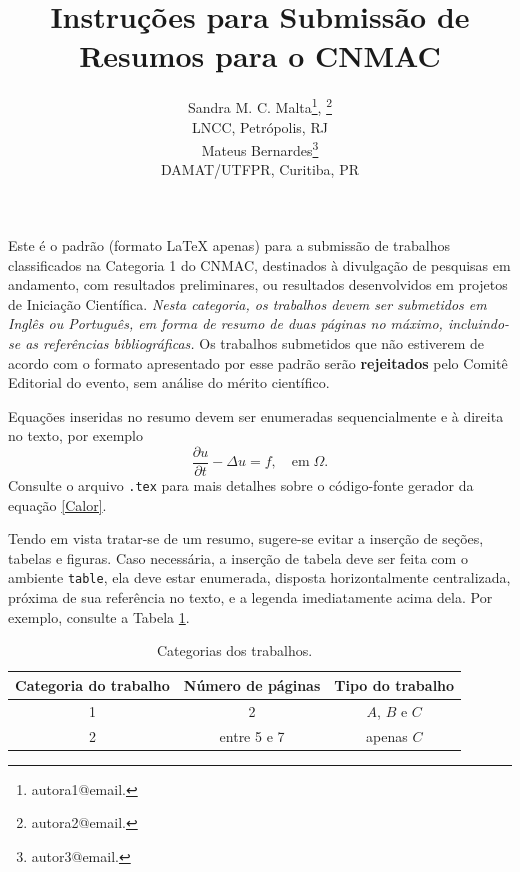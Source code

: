 \documentclass{pssbmac}
\begin{document}

\title{Instruções para Submissão de Resumos para o CNMAC}

\author{
    {\large Sandra M. C. Malta}\thanks{autora1@email.}, {\color{red}{\large Sandra M. C. Malta}\thanks{autora2@email.}}\\
    {\small LNCC, Petrópolis, RJ} \\
    {\large Mateus Bernardes}\thanks{autor3@email.}  \\
    {\small DAMAT/UTFPR, Curitiba, PR} \\
}
\criartitulo



Este é o padrão (formato \LaTeX{} apenas) para a submissão de trabalhos classificados na Categoria 1 do CNMAC, destinados à divulgação de pesquisas em andamento, com resultados preliminares, ou resultados desenvolvidos em projetos de Iniciação Científica. \emph{Nesta categoria, os trabalhos devem ser submetidos em Inglês ou Português, em forma de resumo de duas páginas no máximo, incluindo-se as referências bibliográficas.} Os trabalhos submetidos que não estiverem de acordo com o formato apresentado por esse padrão serão {\bf rejeitados} pelo Comitê Editorial do evento, sem análise do mérito científico.

Equações inseridas no resumo devem ser enumeradas sequencialmente e à direita no texto, por exemplo
\begin{equation}
\frac{\partial u}{\partial t}-\Delta u = f, \quad  \mathrm{em} \; \Omega. \label{Calor}
\end{equation}
Consulte o arquivo \verb!.tex! para mais detalhes sobre o código-fonte gerador da equação \eqref{Calor}.

Tendo em vista tratar-se de um resumo, sugere-se evitar a inserção de seções, tabelas e figuras. Caso necessária, a inserção de tabela deve ser feita com o ambiente \verb!table!, ela deve estar enumerada, disposta horizontalmente centralizada, próxima de sua referência no texto, e a legenda imediatamente acima dela. Por exemplo, consulte a Tabela \ref{tabela01}.

\begin{table}[H]
\caption{ {\small Categorias dos trabalhos.}}
\centering
\begin{tabular}{ccc}
\hline
Categoria do trabalho  & Número de páginas & Tipo do trabalho\\ \hline
1          & 2  & $A$, $B$ e $C$    \\
2          & entre 5 e 7  & apenas $C$ \\
\hline
\end{tabular}\label{tabela01}
\end{table}
\end{document}
